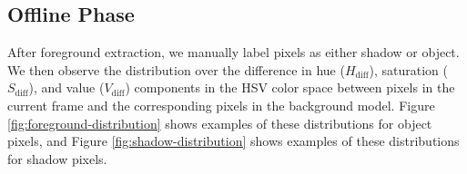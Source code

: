 \subsection{Offline Phase}

After foreground extraction, we manually label pixels as either shadow
or object. We then observe the distribution over the difference in hue
($H_{\text{diff}}$), saturation ($S_{\text{diff}}$), and value
($V_{\text{diff}}$) components in the HSV color space between pixels
in the current frame and the corresponding pixels in the background
model.  Figure \ref{fig:foreground-distribution} shows examples of
these distributions for object pixels, and
Figure \ref{fig:shadow-distribution} shows examples of these
distributions for shadow pixels.

\begin{figure}[t]
  \centering
  \hspace{0.05cm}

\end{figure}
